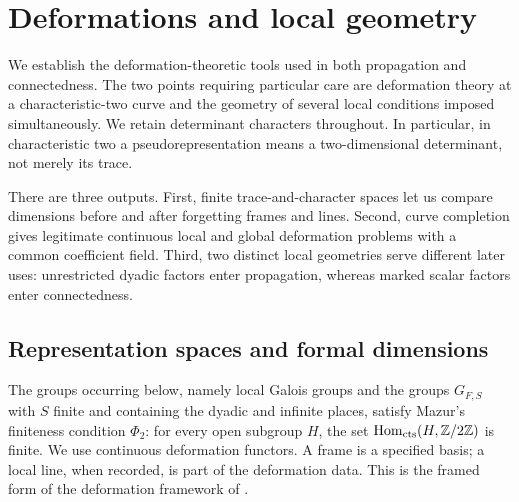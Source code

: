 \section{Deformations and local geometry}\label{sec:deformation}

We establish the deformation-theoretic tools used in both propagation and
connectedness.  The two points requiring particular care are deformation
theory at a characteristic-two curve and the geometry of several local
conditions imposed simultaneously.  We retain determinant characters
throughout.  In particular, in characteristic two a pseudorepresentation
means a two-dimensional determinant, not merely its trace.

There are three outputs. First, finite trace-and-character spaces
let us compare dimensions before and after forgetting frames and
lines. Second, curve completion gives legitimate continuous local
and global deformation problems with a common coefficient field.
Third, two distinct local geometries serve different later uses:
unrestricted dyadic factors enter propagation, whereas marked scalar
factors enter connectedness.

\subsection{Representation spaces and formal dimensions}

The groups occurring below, namely local Galois groups and the groups
$G_{F,S}$ with $S$ finite and containing the dyadic and infinite places,
satisfy Mazur's finiteness condition $\Phi_2$: for every open
subgroup $H$, the set $\operatorname{Hom}_{\mathrm{cts}}(H,\mathbb Z/2\mathbb Z)$ is finite.
We use continuous
deformation functors.  A frame is a specified basis; a local line, when
recorded, is part of the deformation data. This is the framed form
of the deformation framework of \cite{Mazur1989}.

